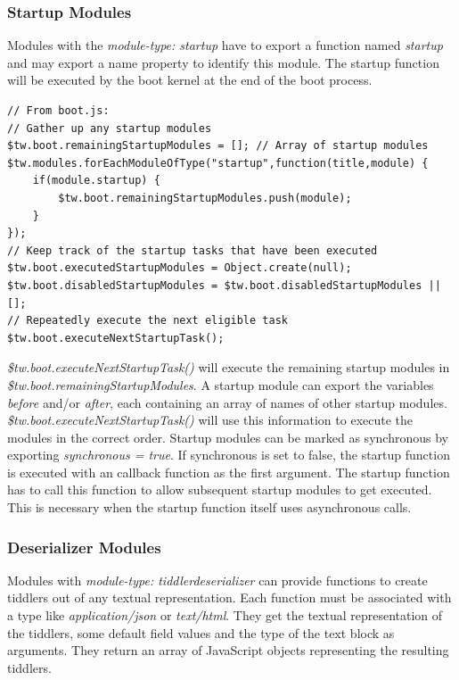 \documentclass[12pt,a4paper]{scrartcl}
\begin{document}
\subsubsection*{Startup Modules}
Modules with the \textit{module-type: startup} have to export a  function named \textit{startup} and may export a name property to identify this module. The startup function will be executed by the boot kernel at the end of the boot process.

\begin{lstlisting}[caption={Boot kernel processing startup modules},label=lst:startup-modules]
// From boot.js:
// Gather up any startup modules
$tw.boot.remainingStartupModules = []; // Array of startup modules
$tw.modules.forEachModuleOfType("startup",function(title,module) {
	if(module.startup) {
		$tw.boot.remainingStartupModules.push(module);
	}
});
// Keep track of the startup tasks that have been executed
$tw.boot.executedStartupModules = Object.create(null);
$tw.boot.disabledStartupModules = $tw.boot.disabledStartupModules || [];
// Repeatedly execute the next eligible task
$tw.boot.executeNextStartupTask();
\end{lstlisting}

\textit{\$tw.boot.executeNextStartupTask()} will execute the remaining startup modules in \textit{\$tw.boot.remainingStartupModules}. A startup module can export the variables \textit{before} and/or \textit{after}, each containing an array of names of other startup modules. \textit{\$tw.boot.executeNextStartupTask()} will use this information to execute the modules in the correct order. Startup modules can be marked as synchronous by exporting \textit{synchronous = true}. If synchronous is set to false, the startup function is executed with an callback function as the first argument. The startup function has to call this function to allow subsequent startup modules to get executed. This is necessary when the startup function itself uses asynchronous calls.

\subsubsection*{Deserializer Modules}
Modules with \textit{module-type: tiddlerdeserializer} can provide functions to create tiddlers out of any textual representation. Each function must be associated with a type like \textit{application/json} or \textit{text/html}.
They get the textual representation of the tiddlers, some default field values and the type of the text block as arguments. They return an array of JavaScript objects representing the resulting tiddlers.
\end{document}
